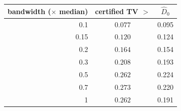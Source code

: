 \begin{tabular}{rcc}
\toprule
bandwidth ($\times$ median) & certified TV $>$ & $\widehat D_0$ \\
\midrule
0.1 & $0.077$ & 0.095 \\
0.15 & $0.120$ & 0.124 \\
0.2 & $0.164$ & 0.154 \\
0.3 & $0.208$ & 0.193 \\
0.5 & $0.262$ & 0.224 \\
0.7 & $0.273$ & 0.220 \\
1 & $0.262$ & 0.191 \\
\bottomrule
\end{tabular}

